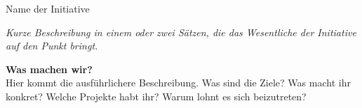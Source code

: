 %
%  

\begin{initiativkarte}{Name der Initiative}   %


  \textit{\textcolor{hawgray}{Kurze Beschreibung in einem oder zwei Sätzen, die das Wesentliche der Initiative auf den Punkt bringt.}}

  \vspace{0.5cm}
  \hawrule

  \textbf{\textcolor{hawblue}{Was machen wir?}}\\[0.3cm]
  Hier kommt die ausführlichere Beschreibung. Was sind die Ziele? Was macht ihr konkret? Welche Projekte habt ihr? Warum lohnt es sich beizutreten?

  \vspace{0.5cm}

    

  \vspace{0.6cm}
  \hawrule


\end{initiativkarte}
